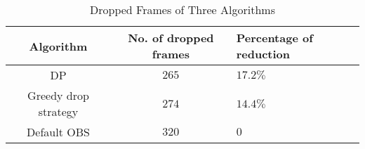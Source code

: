 \begin{table}[tb]
\centering
\caption{Dropped Frames of Three Algorithms}
\label{tab_drop}
{\setlength{\tabcolsep}{1pt}
\begin{tabular}{|c|c|l|}
\hline
\textbf{Algorithm} & \textbf{No. of dropped frames}   &\textbf{Percentage of reduction}     \\ \hline
DP           &$265$          &$17.2\%$                 \\ \hline
Greedy drop strategy       &$274$      &$14.4\%$              \\ \hline
Default OBS       &$320$  &$0$ \\ \hline
\end{tabular}}
\end{table}
